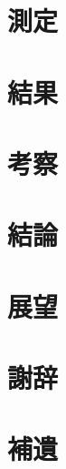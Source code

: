 \documentclass[uplatex,openany,oneside,a4j,11pt]{jsbook}
\begin{document}
\chapter{測定}
    \begin{abstract}
    \end{abstract}
    

\chapter{結果}
    \begin{abstract}
    \end{abstract}
    

\chapter{考察}
    \begin{abstract}
    \end{abstract}
    

\chapter{結論}
    \begin{abstract}
    \end{abstract}
    

\chapter{展望}
    \begin{abstract}
    \end{abstract}
    

\chapter{謝辞}
    \begin{abstract}
    \end{abstract}
    

\chapter{補遺}
    \begin{abstract}
    \end{abstract}
    
\printbibliography[title=参考文献]
\end{document}
